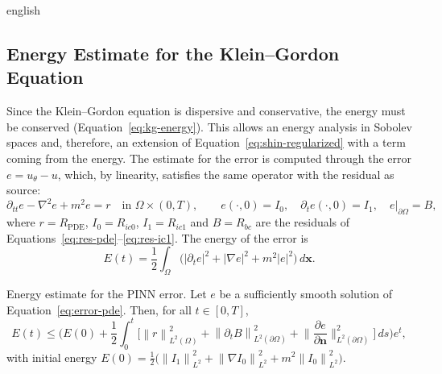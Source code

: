 \documentclass[11pt,letterpaper,twoside,openright]{book} %
\newcommand{\norm}[1]{\left\lVert #1 \right\rVert}
\newcommand{\abs}[1]{\left\lvert #1 \right\rvert}
\begin{document}
\begin{hyphenrules}{english}
\subsection{Energy Estimate for the Klein--Gordon Equation}\label{subsec:energy-estimate}\label{sec:energy-estimate}

Since the Klein--Gordon equation is dispersive and conservative, the energy must be conserved
(Equation~\eqref{eq:kg-energy}). This allows an energy analysis in Sobolev spaces and, therefore, an extension
of Equation~\eqref{eq:shin-regularized} with a term coming from the energy. The estimate for the error is computed
through the error $e=u_\theta-u$, which, by linearity, satisfies the same operator with the residual as
source:
\begin{equation}
  \partial_{tt}e-\nabla^2e+m^2e=r\quad\text{in }\Omega\times(0,T),\qquad
  e(\cdot,0)=I_0,\quad\partial_te(\cdot,0)=I_1,\quad e|_{\partial\Omega}=B,
  \label{eq:error-pde}
\end{equation}
where $r=R_{\mathrm{PDE}}$, $I_0=R_{ic0}$, $I_1=R_{ic1}$ and $B=R_{bc}$ are the residuals of
Equations~\eqref{eq:res-pde}--\eqref{eq:res-ic1}. The energy of the error is
\begin{equation}
  E(t)=\frac12\int_\Omega\Big(\abs{\partial_te}^2+\abs{\nabla e}^2+m^2\abs{e}^2\Big)\,d\mathbf{x}.
  \label{eq:error-energy}
\end{equation}

\begin{teorema}{Energy estimate for the PINN error.}\label{thm:energy-estimate}
Let $e$ be a sufficiently smooth solution of Equation~\eqref{eq:error-pde}. Then, for all $t\in[0,T]$,
\begin{equation}
  E(t)\le\Big(E(0)+\frac12\int_0^t\Big[\norm{r}^2_{L^2(\Omega)}+\norm{\partial_tB}^2_{L^2(\partial\Omega)}
  +\Big\|\frac{\partial e}{\partial\mathbf{n}}\Big\|^2_{L^2(\partial\Omega)}\Big]\,d s\Big)e^{t},
  \label{eq:energy-bound}
\end{equation}
with initial energy
$E(0)=\frac12\big(\norm{I_1}^2_{L^2}+\norm{\nabla I_0}^2_{L^2}+m^2\norm{I_0}^2_{L^2}\big)$.
\end{teorema}


\end{hyphenrules}
\end{document}
